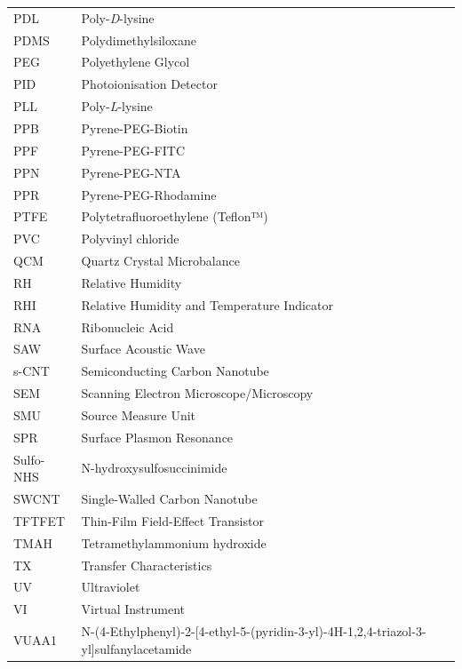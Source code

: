 \documentclass[
  a4paper,
]{scrbook}
\begin{document}
\newpage
\fancyhf{} %
\thispagestyle{fancy} %
\renewcommand{\headrulewidth}{0pt}
\fancyfoot[R]{\thepage} %
\begin{table}[H]
  \begin{tabular}{@{}p{} p{}@{}}  %
    PDL & Poly-\textit{D}-lysine  \\[5pt]
    PDMS  & Polydimethylsiloxane   \\  [5pt]
    PEG  & Polyethylene Glycol  \\[5pt] 
    PID  & Photoionisation Detector  \\[5pt] 
    PLL  & Poly-\textit{L}-lysine  \\[5pt]
    PPB  & Pyrene-PEG-Biotin  \\[5pt]
    PPF  & Pyrene-PEG-FITC  \\[5pt]
    PPN  & Pyrene-PEG-NTA  \\[5pt]
    PPR  & Pyrene-PEG-Rhodamine  \\[5pt]
    PTFE  & Polytetrafluoroethylene (Teflon™)  \\[5pt]
    PVC  & Polyvinyl chloride  \\[5pt]
    QCM  & Quartz Crystal Microbalance  \\[5pt]
    RH  & Relative Humidity  \\[5pt]
    RHI  & Relative Humidity and Temperature Indicator  \\[5pt] 
    RNA  & Ribonucleic Acid   \\[5pt]
    SAW  & Surface Acoustic Wave   \\[5pt]
    s-CNT  & Semiconducting Carbon Nanotube   \\[5pt]
    SEM  & Scanning Electron Microscope/Microscopy   \\[5pt]
    SMU  & Source Measure Unit   \\[5pt]
    SPR  & Surface Plasmon Resonance   \\[5pt]
    Sulfo-NHS  & N-hydroxysulfosuccinimide   \\[5pt]
    SWCNT  & Single-Walled Carbon Nanotube   \\[5pt]
    TFTFET  & Thin-Film Field-Effect Transistor  \\[5pt]
    TMAH  & Tetramethylammonium hydroxide  \\[5pt]
    TX  & Transfer Characteristics  \\[5pt]
    UV  & Ultraviolet  \\[5pt]
    VI  & Virtual Instrument  \\[5pt]
    VUAA1  & N-(4-Ethylphenyl)-2-{[4-ethyl-5-(pyridin-3-yl)-4H-1,2,4-triazol-3-yl]sulfanyl}acetamide  \\[5pt] 
  \end{tabular}
\end{table}
\end{document}
